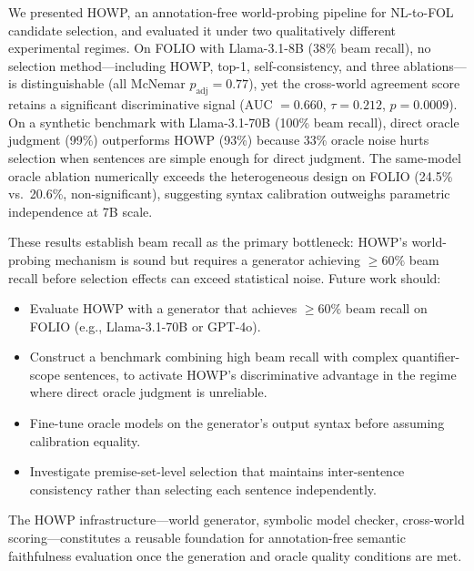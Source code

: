 \documentclass[11pt,letterpaper]{article}
\begin{document}
We presented HOWP, an annotation-free world-probing pipeline for NL-to-FOL candidate selection, and evaluated it under two qualitatively different experimental regimes. On FOLIO with Llama-3.1-8B (38\% beam recall), no selection method---including HOWP, top-1, self-consistency, and three ablations---is distinguishable (all McNemar $p_{\text{adj}} = 0.77$), yet the cross-world agreement score retains a significant discriminative signal (AUC $= 0.660$, $\tau = 0.212$, $p = 0.0009$). On a synthetic benchmark with Llama-3.1-70B (100\% beam recall), direct oracle judgment (99\%) outperforms HOWP (93\%) because 33\% oracle noise hurts selection when sentences are simple enough for direct judgment. The same-model oracle ablation numerically exceeds the heterogeneous design on FOLIO (24.5\% vs.\ 20.6\%, non-significant), suggesting syntax calibration outweighs parametric independence at 7B scale.

These results establish beam recall as the primary bottleneck: HOWP's world-probing mechanism is sound but requires a generator achieving $\geq 60\%$ beam recall before selection effects can exceed statistical noise. Future work should:
\begin{itemize}
  \item Evaluate HOWP with a generator that achieves $\geq 60\%$ beam recall on FOLIO (e.g., Llama-3.1-70B or GPT-4o).
  \item Construct a benchmark combining high beam recall with complex quantifier-scope sentences, to activate HOWP's discriminative advantage in the regime where direct oracle judgment is unreliable.
  \item Fine-tune oracle models on the generator's output syntax before assuming calibration equality.
  \item Investigate premise-set-level selection that maintains inter-sentence consistency rather than selecting each sentence independently.
\end{itemize}

The HOWP infrastructure---world generator, symbolic model checker, cross-world scoring---constitutes a reusable foundation for annotation-free semantic faithfulness evaluation once the generation and oracle quality conditions are met.



\end{document}

